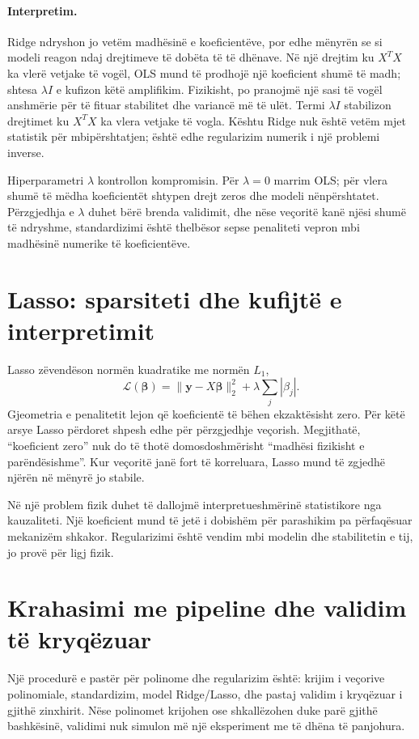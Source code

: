 \documentclass[12pt,a4paper,oneside]{book}
\begin{document}
\paragraph{Interpretim.}
Ridge ndryshon jo vetëm madhësinë e koeficientëve, por edhe mënyrën se si modeli reagon ndaj drejtimeve të dobëta të të dhënave. Në një drejtim ku $X^TX$ ka vlerë vetjake të vogël, OLS mund të prodhojë një koeficient shumë të madh; shtesa $\lambda I$ e kufizon këtë amplifikim. Fizikisht, po pranojmë një sasi të vogël anshmërie për të fituar stabilitet dhe variancë më të ulët.
Termi $\lambda I$ stabilizon drejtimet ku $X^TX$ ka vlera vetjake të vogla. Kështu Ridge nuk është vetëm mjet statistik për mbipërshtatjen; është edhe regularizim numerik i një problemi inverse.

Hiperparametri $\lambda$ kontrollon kompromisin. Për $\lambda=0$ marrim OLS; për vlera shumë të mëdha koeficientët shtypen drejt zeros dhe modeli nënpërshtatet. Përzgjedhja e $\lambda$ duhet bërë brenda validimit, dhe nëse veçoritë kanë njësi shumë të ndryshme, standardizimi është thelbësor sepse penaliteti vepron mbi madhësinë numerike të koeficientëve.

\section{Lasso: sparsiteti dhe kufijtë e interpretimit}

Lasso zëvendëson normën kuadratike me normën $L_1$,
\[
\mathcal L(\boldsymbol\beta)=\|\mathbf y-X\boldsymbol\beta\|_2^2+\lambda\sum_j|\beta_j|.
\]
Gjeometria e penalitetit lejon që koeficientë të bëhen ekzaktësisht zero. Për këtë arsye Lasso përdoret shpesh edhe për përzgjedhje veçorish. Megjithatë, ``koeficient zero'' nuk do të thotë domosdoshmërisht ``madhësi fizikisht e parëndësishme''. Kur veçoritë janë fort të korreluara, Lasso mund të zgjedhë njërën në mënyrë jo stabile.

Në një problem fizik duhet të dallojmë interpretueshmërinë statistikore nga kauzaliteti. Një koeficient mund të jetë i dobishëm për parashikim pa përfaqësuar mekanizëm shkakor. Regularizimi është vendim mbi modelin dhe stabilitetin e tij, jo provë për ligj fizik.

\section{Krahasimi me pipeline dhe validim të kryqëzuar}

Një procedurë e pastër për polinome dhe regularizim është: krijim i veçorive polinomiale, standardizim, model Ridge/Lasso, dhe pastaj validim i kryqëzuar i gjithë zinxhirit. Nëse polinomet krijohen ose shkallëzohen duke parë gjithë bashkësinë, validimi nuk simulon më një eksperiment me të dhëna të panjohura.
\end{document}
